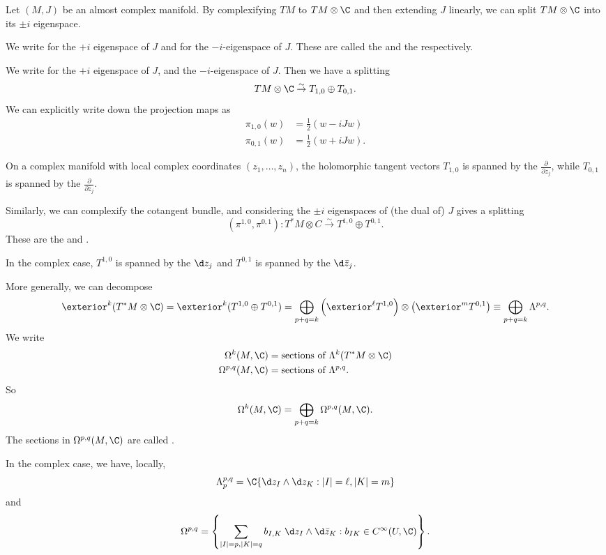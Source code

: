 \documentclass[a4paper]{article}
\begin{document}
Let $(M, J)$ be an almost complex manifold. By complexifying $TM$ to $TM \otimes \C$ and then extending $J$ linearly, we can split $TM \otimes \C$ into its $\pm i$ eigenspace.
\begin{notation}
  We write  for the $+i$ eigenspace of $J$ and  for the $-i$-eigenspace of $J$. These are called the  and the  respectively.
\end{notation}
We write  for the $+i$ eigenspace of $J$, and  the $-i$-eigenspace of $J$. Then we have a splitting
\[
  TM \otimes \C \overset{\sim}{\to} T_{1, 0} \oplus T_{0, 1}.
\]
We can explicitly write down the projection maps as
\begin{align*}
  \pi_{1, 0} (w) &= \frac{1}{2} (w - i J w)\\
  \pi_{0, 1} (w) &= \frac{1}{2} (w + i J w).
\end{align*}
\begin{eg}
  On a complex manifold with local complex coordinates $(z_1, \ldots, z_n)$, the holomorphic tangent vectors $T_{1, 0}$ is spanned by the $\frac{\partial}{\partial z_j}$, while $T_{0, 1}$ is spanned by the $\frac{\partial}{\partial \bar{z}_j}$.
\end{eg}
Similarly, we can complexify the cotangent bundle, and considering the $\pm i$ eigenspaces of (the dual of) $J$ gives a splitting
\[
  (\pi^{1, 0}, \pi^{0, 1}): T^*M \otimes C \overset{\sim}{\to} T^{1, 0} \oplus T^{0, 1}.
\]
These are the  and .
\begin{eg}
  In the complex case, $T^{1, 0}$ is spanned by the $\d z_j$ and $T^{0, 1}$ is spanned by the $\d \bar{z}_j$.
\end{eg}

More generally, we can decompose
\[
  \exterior^k (T^* M \otimes \C) = \exterior^k (T^{1, 0} \oplus T^{0, 1}) = \bigoplus_{p + q = k} \left(\exterior^\ell T^{1, 0}\right) \otimes \left(\exterior^m T^{0, 1}\right) \equiv \bigoplus_{p + q = k} \Lambda^{p, q}.
\]
We write
\begin{align*}
  \Omega^k (M, \C) &= \text{sections of }\Lambda^k (T^* M \otimes \C)\\
  \Omega^{p, q}(M, \C) &= \text{sections of }\Lambda^{p, q}.
\end{align*}
So
\[
  \Omega^k(M, \C) = \bigoplus_{p + q = k} \Omega^{p, q} (M, \C).
\]
The sections in $\Omega^{p, q}(M, \C)$ are called .
\begin{eg}
  In the complex case, we have, locally,
  \[
    \Lambda^{p, q}_p = \C\{\d z_I \wedge \d z_K : |I| = \ell, |K| = m\}
  \]
  and
  \[
    \Omega^{p, q} = \left\{\sum_{|I| = p, |K| = q} b_{I, K}\; \d z_I \wedge \d \bar{z}_K : b_{IK} \in C^\infty(U, \C)\right\}.
  \]
\end{eg}
\end{document}
